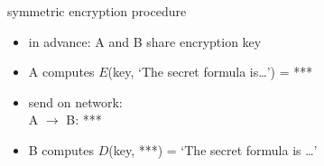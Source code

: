 \begin{frame}{symmetric encryption procedure}
    \begin{itemize}
    \item in advance: A and B share encryption key
    \vspace{.5cm}
    \item A computes $E$(key, `The secret formula is\ldots') = ***
    \item send on network: \\
    A $\rightarrow$ B: ***
    \item<2-> B computes $D$(key, ***) = `The secret formula is \ldots'
    \end{itemize}
\end{frame}
